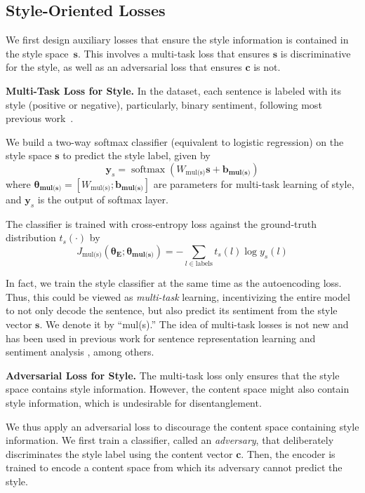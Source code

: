 \documentclass[11pt,a4paper]{article}
\newcommand{\loss}[1]{J_{\text{#1}}}
\newcommand{\nnweight}[1]{\bm{\theta_{\text{#1}}}}
\newcommand{\weight}[1]{W_{\text{#1}}}
\newcommand{\bias}[1]{\bm{b_{\text{#1}}}}
\begin{document}
\subsection{Style-Oriented Losses}

We first design auxiliary losses that ensure the style information is contained in the style space~$\bm s$.
This involves a multi-task loss that ensures $\bm s$ is discriminative for the style, as well as an adversarial loss that ensures $\bm c$ is not.

\textbf{Multi-Task Loss for Style.} In the dataset, each sentence is labeled with its style (positive or negative), particularly, binary sentiment, following most previous work~\cite{hu2017toward,shen2017style,fu2018style,zhao2018adversarially}.

We build a two-way softmax classifier (equivalent to logistic regression) on the style space $\bm s$ to predict the style label, given by
\begin{equation} \label{eqn:class-pred}
	\bm y_s = \operatorname{softmax}(\weight{mul(s)} \bm s + \bias{mul(s)})
\end{equation}
where $\nnweight{mul(s)}=[\weight{mul(s)}; \bias{mul(s)}]$ are parameters for multi-task learning of style, and $\bm y_s$ is the output of softmax layer.

The classifier is trained with cross-entropy loss against the ground-truth distribution $t_s(\cdot)$ by
\begin{equation} \label{eqn:style-multi-task-loss}
	\loss{mul(s)}(\nnweight{E};\nnweight{mul(s)}) = - \sum_{l\in\text{labels}} t_s(l)\log y_s(l)
\end{equation}

In fact, we train the style classifier at the same time as the autoencoding loss.
Thus, this could be viewed as \textit{multi-task} learning, incentivizing the entire model to not only decode the sentence, but also predict its sentiment from the style vector $\bm  s$.
We denote it by ``mul(s).''
The idea of multi-task losses is not new and has been used in previous work for sentence representation learning \cite{jernite2017discourse} and sentiment analysis \cite{balikas2017multitask}, among others.


\textbf{Adversarial Loss for Style.}
The multi-task loss only ensures that the style space contains style information.
However, the content space might also contain style information, which is undesirable for disentanglement.

We thus apply an adversarial loss to discourage the content space containing style information.
We first train a classifier, called an \textit{adversary}, that deliberately discriminates the style label using the content vector $\bm c$.
Then, the encoder is trained to encode a content space from which its adversary cannot predict the style.
\end{document}
